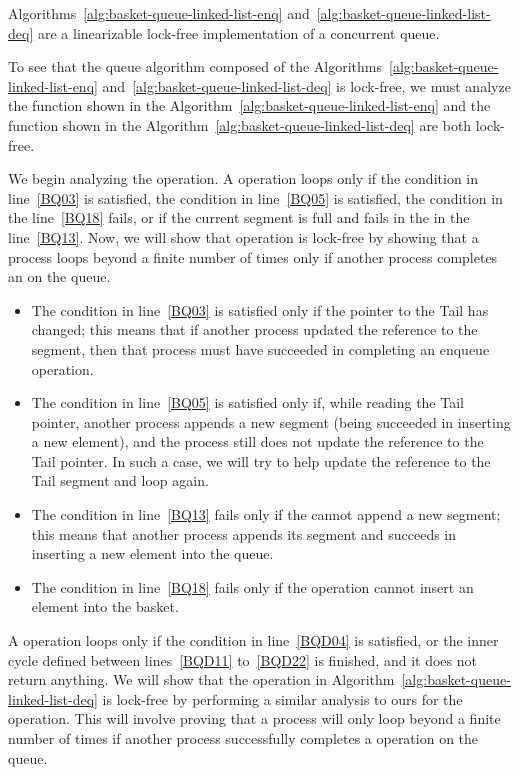 \begin{theorem}
    Algorithms~\ref{alg:basket-queue-linked-list-enq} and~\ref{alg:basket-queue-linked-list-deq} are a linearizable lock-free implementation of a concurrent queue.
\end{theorem}

\begin{proofT}
  To see that the queue algorithm composed of the Algorithms~\ref{alg:basket-queue-linked-list-enq} and~\ref{alg:basket-queue-linked-list-deq} is lock-free, we must analyze the \Enq function shown in the Algorithm~\ref{alg:basket-queue-linked-list-enq} and the \Deq function shown in the Algorithm~\ref{alg:basket-queue-linked-list-deq} are both lock-free.

  We begin analyzing the \Enq operation. A \Enq operation loops only if the condition in line~\ref{BQ03} is satisfied, the condition in line~\ref{BQ05} is satisfied, the condition in the line~\ref{BQ18} fails, or if the current segment is full and fails in the \CAS in the line~\ref{BQ13}. Now, we will show that \Enq operation is lock-free by showing that a process loops beyond a finite number of times only if another process completes an \Enq on the queue.

  \begin{itemize}
    \item The condition in line~\ref{BQ03} is satisfied only if the pointer to the Tail has changed; this means that if another process updated the reference to the segment, then that process must have succeeded in completing an enqueue operation.
    \item The condition in line~\ref{BQ05} is satisfied only if, while reading the Tail pointer, another process appends a new segment (being succeeded in inserting a new element), and the process still does not update the reference to the Tail pointer. In such a case, we will try to help update the reference to the Tail segment and loop again.
    \item The condition in line~\ref{BQ13} fails only if the \CAS cannot append a new segment; this means that another process appends its segment and succeeds in inserting a new element into the queue.
    \item The condition in line~\ref{BQ18} fails only if the operation cannot insert an element into the basket.
  \end{itemize}

  A \Deq operation loops only if the condition in line~\ref{BQD04} is satisfied, or the inner cycle defined between lines~\ref{BQD11} to~\ref{BQD22} is finished, and it does not return anything. We will show that the \Deq operation in Algorithm~\ref{alg:basket-queue-linked-list-deq} is lock-free by performing a similar analysis to ours for the \Enq operation. This will involve proving that a process will only loop beyond a finite number of times if another process successfully completes a \Deq operation on the queue.


\end{proofT}
